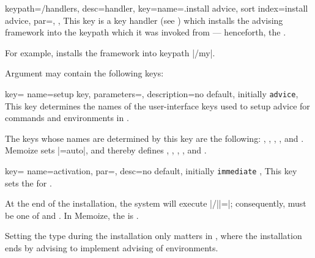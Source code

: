 \documentclass[a4paper,11pt]{article}
\begin{document}
\begin{doc}{
    keypath={/handlers}, desc=handler,
    key={name=.install advice,
      sort index=install advice,
      par=,
    },
  }
  This key is a  key handler (see ) which
  installs the advising framework into the keypath which it was invoked from
  --- henceforth, the .

  For example,  installs the framework into keypath |/my|.

  Argument  may contain the following keys:
  \begin{doc}{key={
        name=setup key,
        parameters=,
        description={no default, initially \texttt{advice}}},
    }
    This key determines the names of the user-interface keys used to setup
    advice for commands and environments in .

    The keys whose names are determined by this key are the following:
    , , ,
    ,  and .  Memoize sets |=auto|, and
    thereby defines , , ,
    ,  and .
  \end{doc}
  \begin{doc}{key={
        name=activation,
        par=,
        desc={no default, initially \texttt{immediate}}
      },
    }
    This key sets the  for .

    At the end of the installation, the system will execute
    |/||=|;
    consequently,  must be one of
     and .  In
    Memoize, the  is
    .

    Setting the  type during the installation only matters
    in , where the installation ends by advising 
    to implement advising of environments.
  \end{doc}


\end{doc}
\end{document}
